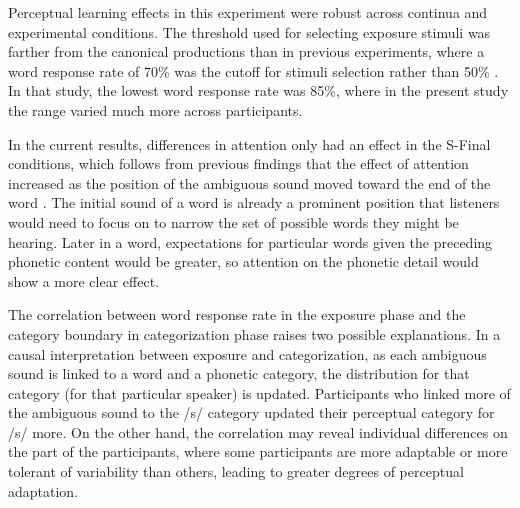 \documentclass[a4paper,11pt,twocolumn]{article}
\begin{document}
Perceptual learning effects in this experiment were robust across continua and experimental conditions. The threshold used for selecting exposure stimuli was farther from the canonical productions than in previous experiments, where a word response rate of 70\% was the cutoff for stimuli selection rather than 50\% \cite{Reinisch2013}.  In that study, the lowest word response rate was 85\%, where in the present study the range varied much more across participants.

In the current results, differences in attention only had an effect in the S-Final conditions, which follows from previous findings that the effect of attention increased as the position of the ambiguous sound moved toward the end of the word \cite{Pitt2012}.  The initial sound of a word is already a prominent position that listeners would need to focus on to narrow the set of possible words they might be hearing.  Later in a word, expectations for particular words given the preceding phonetic content would be greater, so attention on the phonetic detail would show a more clear effect.

The correlation between word response rate in the exposure phase and the category boundary in categorization phase raises two possible explanations.  In a causal interpretation between exposure and categorization, as each ambiguous sound is linked to a word and a phonetic category, the distribution for that category (for that particular speaker) is updated.  Participants who linked more of the ambiguous sound to the /s/ category updated their perceptual category for /s/ more.  On the other hand, the correlation may reveal individual differences on the part of the participants, where some participants are more adaptable or more tolerant of variability than others, leading to greater degrees of perceptual adaptation.



\end{document}

